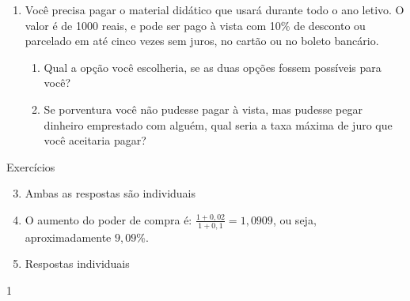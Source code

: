 \begin{enumerate}
\item Você precisa pagar o material didático que usará durante todo o ano letivo. O valor é de 1000 reais, e pode ser pago à vista com 10\% de desconto ou parcelado em até cinco vezes sem juros, no cartão ou no boleto bancário. 
  \begin{enumerate}
  \item Qual a opção você escolheria, se as duas opções fossem possíveis para você?
  \item Se porventura você não pudesse pagar à vista, mas pudesse pegar dinheiro emprestado com alguém, qual seria a taxa máxima de juro que você aceitaria pagar?
  \end{enumerate}
\end{enumerate}
\clearpage
\begin{resposta}{Exercícios}
{\begin{enumerate}
\setcounter{enumi}{2}
    \item Ambas as respostas são individuais

    \item O aumento do poder de compra é: $\displaystyle \frac{1+0{,}02}{1+0{,}1}=1{,}0909$, ou seja, aproximadamente $9{,}09$\%.
    \item Respostas individuais
  \end{enumerate}
}{1}
\end{resposta}
